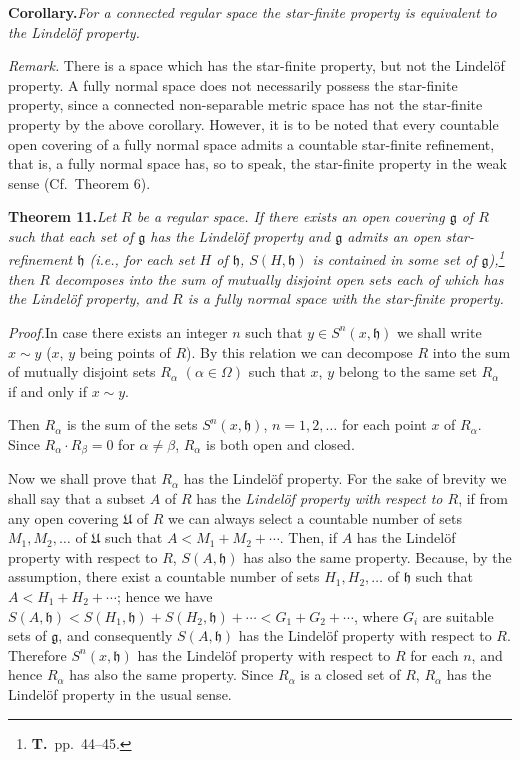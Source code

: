 \documentclass[11pt,a4paper,leqno]{article}
\newcommand{\g}{\mathfrak g}
\newcommand{\thm}[2]{\par\medskip\textbf{Theorem #1.}\quad\textit{#2}\par}
\newcommand{\proof}{\textit{Proof.}\quad}
\begin{document}
\textbf{Corollary.}\quad\textit{For a connected regular space the star-finite property is equivalent to the Lindelöf property.}

\textit{Remark.} There is a space which has the star-finite property, but not the Lindelöf property. A fully normal space does not necessarily possess the star-finite property, since a connected non-separable metric space has not the star-finite property by the above corollary. However, it is to be noted that every countable open covering of a fully normal space admits a countable star-finite refinement, that is, a fully normal space has, so to speak, the star-finite property in the weak sense (Cf.\ Theorem 6).

\thm{11}{Let $R$ be a regular space. If there exists an open covering $\g$ of $R$ such that each set of $\g$ has the Lindelöf property and $\g$ admits an open star-refinement $\mathfrak h$ (i.e., for each set $H$ of $\mathfrak h$, $S(H,\mathfrak h)$ is contained in some set of $\g$),\footnote{\textbf{T.}\ pp.\ 44--45.} then $R$ decomposes into the sum of mutually disjoint open sets each of which has the Lindelöf property, and $R$ is a fully normal space with the star-finite property.}

\proof In case there exists an integer $n$ such that $y\in S^n(x,\mathfrak h)$ we shall write $x\sim y$ ($x$, $y$ being points of $R$). By this relation we can decompose $R$ into the sum of mutually disjoint sets $R_\alpha$ $(\alpha\in\Omega)$ such that $x$, $y$ belong to the same set $R_\alpha$ if and only if $x\sim y$.

Then $R_\alpha$ is the sum of the sets $S^n(x,\mathfrak h)$, $n=1,2,\ldots$ for each point $x$ of $R_\alpha$. Since $R_\alpha\cdot R_\beta=0$ for $\alpha\ne\beta$, $R_\alpha$ is both open and closed.

Now we shall prove that $R_\alpha$ has the Lindelöf property. For the sake of brevity we shall say that a subset $A$ of $R$ has the \textit{Lindelöf property with respect to $R$}, if from any open covering $\mathfrak U$ of $R$ we can always select a countable number
\newpage
\noindent of sets $M_1,M_2,\ldots$ of $\mathfrak U$ such that $A<M_1+M_2+\cdots$. Then, if $A$ has the Lindelöf property with respect to $R$, $S(A,\mathfrak h)$ has also the same property. Because, by the assumption, there exist a countable number of sets $H_1,H_2,\ldots$ of $\mathfrak h$ such that $A<H_1+H_2+\cdots$; hence we have $S(A,\mathfrak h)<S(H_1,\mathfrak h)+S(H_2,\mathfrak h)+\cdots<G_1+G_2+\cdots$, where $G_i$ are suitable sets of $\g$, and consequently $S(A,\mathfrak h)$ has the Lindelöf property with respect to $R$. Therefore $S^n(x,\mathfrak h)$ has the Lindelöf property with respect to $R$ for each $n$, and hence $R_\alpha$ has also the same property. Since $R_\alpha$ is a closed set of $R$, $R_\alpha$ has the Lindelöf property in the usual sense.
\end{document}
